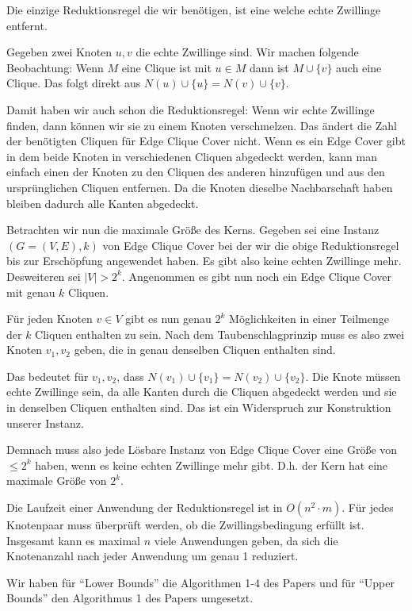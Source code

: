 
Die einzige Reduktionsregel die wir benötigen, ist eine welche echte Zwillinge entfernt.

Gegeben zwei Knoten $u, v$ die echte Zwillinge sind. Wir machen folgende Beobachtung: Wenn $M$ eine Clique ist mit $u \in M$ dann ist $M \cup \{v\}$ auch eine Clique. Das folgt direkt aus $N(u) \cup \{u\} = N(v) \cup \{v\}$.

Damit haben wir auch schon die Reduktionsregel: Wenn wir echte Zwillinge finden, dann können wir sie zu einem Knoten verschmelzen. Das ändert die Zahl der benötigten Cliquen für Edge Clique Cover nicht. Wenn es ein Edge Cover gibt in dem beide Knoten in verschiedenen Cliquen abgedeckt werden, kann man einfach einen der Knoten zu den Cliquen des anderen hinzufügen und aus den ursprünglichen Cliquen entfernen. Da die Knoten dieselbe Nachbarschaft haben bleiben dadurch alle Kanten abgedeckt.

Betrachten wir nun die maximale Größe des Kerns. Gegeben sei eine Instanz $(G=(V,E),k)$ von Edge Clique Cover bei der wir die obige Reduktionsregel bis zur Erschöpfung angewendet haben. Es gibt also keine echten Zwillinge mehr. Desweiteren sei $|V| > 2^k$. Angenommen es gibt nun noch ein Edge Clique Cover mit genau $k$ Cliquen.

Für jeden Knoten $v \in V$ gibt es nun genau $2^k$ Möglichkeiten in einer Teilmenge der $k$ Cliquen enthalten zu sein. Nach dem Taubenschlagprinzip muss es also zwei Knoten $v_1, v_2$ geben, die in genau denselben Cliquen enthalten sind.

Das bedeutet für $v_1, v_2$, dass $N(v_1) \cup \{v_1\} = N(v_2) \cup \{v_2\}$. Die Knote müssen echte Zwillinge sein, da alle Kanten durch die Cliquen abgedeckt werden und sie in denselben Cliquen enthalten sind. Das ist ein Widerspruch zur Konstruktion unserer Instanz.

Demnach muss also jede Lösbare Instanz von Edge Clique Cover eine Größe von $\leq 2^k$ haben, wenn es keine echten Zwillinge mehr gibt. D.h. der Kern hat eine maximale Größe von $2^k$.

Die Laufzeit einer Anwendung der Reduktionsregel ist in $O(n^2 \cdot m)$. Für jedes Knotenpaar muss überprüft werden, ob die Zwillingsbedingung erfüllt ist. Insgesamt kann es maximal $n$ viele Anwendungen geben, da sich die Knotenanzahl nach jeder Anwendung um genau 1 reduziert.


Wir haben für ``Lower Bounds'' die Algorithmen 1-4 des Papers und für ``Upper Bounds'' den Algorithmus 1 des Papers umgesetzt.

